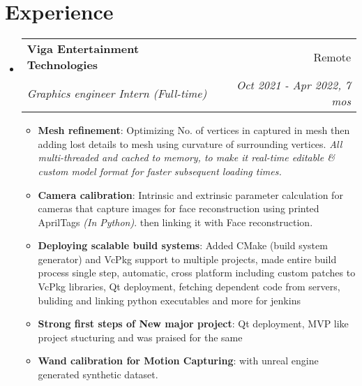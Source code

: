 \documentclass[a4paper,20pt]{article}
\makeatletter
\newcommand{\resumeItem}[2]{
  \item\small{
    \textbf{#1}{: #2 \vspace{-2pt}}
  }
}
\newcommand{\resumeSubheading}[4]{
  \vspace{-1pt}\item
    \begin{tabular*}{0.97\textwidth}{l@{\extracolsep{\fill}}r}
      \textbf{#1} & #2 \\
      \textit{#3} & \textit{#4} \\
    \end{tabular*}\vspace{-5pt}
}
\newcommand{\resumeSubHeadingListStart}{\begin{itemize}[leftmargin=*]}
\newcommand{\resumeSubHeadingListEnd}{\end{itemize}}
\newcommand{\resumeItemListStart}{\begin{itemize}}
\newcommand{\resumeItemListEnd}{\end{itemize}\vspace{-5pt}}
\makeatother
\begin{document}
\section{Experience}
  \resumeSubHeadingListStart
    \resumeSubheading{Viga Entertainment Technologies}{Remote}
    {Graphics engineer Intern (Full-time)}{Oct 2021 - Apr 2022, 7 mos}
    \resumeItemListStart
        \resumeItem{Mesh refinement}
          {Optimizing No. of vertices in captured in mesh then adding lost details to mesh using curvature of surrounding vertices. \textit{All multi-threaded and cached to memory, to make it real-time editable \& custom model format for faster subsequent loading times.}}
        \resumeItem{Camera calibration}
          {Intrinsic and extrinsic parameter calculation for cameras that capture images for face reconstruction using printed AprilTags \textit{(In Python)}. then linking it with Face reconstruction.}
        \resumeItem{Deploying scalable build systems}
          {Added CMake (build system generator) and VcPkg support to multiple projects, made entire build process single step, automatic, cross platform including custom patches to VcPkg libraries, Qt deployment, fetching dependent code from servers, buliding and linking python executables and more for jenkins}
        \resumeItem{Strong first steps of New major project}
          {Qt deployment, MVP like project stucturing and was praised for the same}
        \resumeItem{Wand calibration for Motion Capturing}{with unreal engine generated synthetic dataset.}
      \resumeItemListEnd
\resumeSubHeadingListEnd

\vspace{-5pt}
\end{document}

